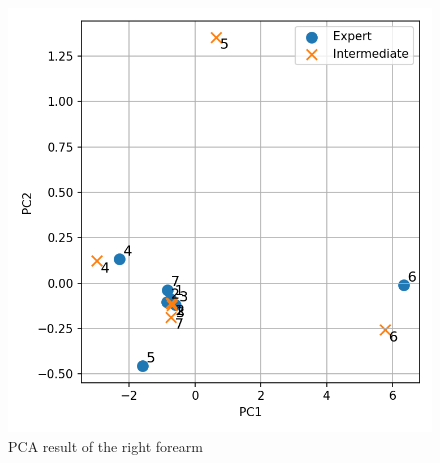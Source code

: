 \documentclass[conference]{IEEEtran}
\begin{document}
%
\begin{figure}[t]
	\centering
	\includegraphics[scale=0.5]{fig/RFArm.pdf}
	\caption{PCA result of the right forearm}
	\label{fig:RFarm}
	\vspace{-0.4cm}
\end{figure}
%
\end{document}
